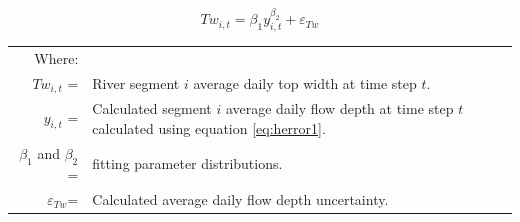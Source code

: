 \begin{linenumbers}
\begin{equation}
	\label{eq:Tw1}
	Tw_{i,t} = \beta_1 y_{i,t} ^{\beta_2} + \varepsilon_{Tw}
\end{equation}
\begin{tabular}{r p{5in}}
	Where: & \\
	$ Tw_{i,t} $ =& River segment $ i $ average daily top width at time step $ t $.\\
	$ y_{i,t} $ =& Calculated segment $ i $ average daily flow depth at time step $ t $ calculated using equation \ref{eq:herror1}.\\
	$ \beta_1 $ and $ \beta_2 $ =& fitting parameter distributions.\\
	$ \varepsilon_{Tw} $=& Calculated average daily flow depth uncertainty.\\
\end{tabular}\\


\end{linenumbers}
